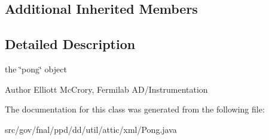 \subsection*{Additional Inherited Members}


\subsection{Detailed Description}
the \char`\"{}pong\char`\"{} object

\begin{DoxyAuthor}{Author}
Elliott Mc\-Crory, Fermilab A\-D/\-Instrumentation 
\end{DoxyAuthor}


The documentation for this class was generated from the following file\-:\begin{DoxyCompactItemize}
\item 
src/gov/fnal/ppd/dd/util/attic/xml/Pong.\-java\end{DoxyCompactItemize}
